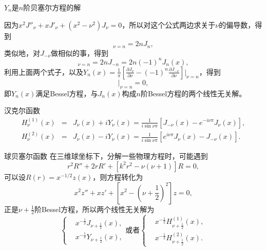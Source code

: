 \documentclass[11pt]{beamer}
\begin{document}
\begin{frame}{$Y_n$是$n$阶贝塞尔方程的解}

因为$ x^2 J''_\nu + x J'_\nu + (x^2 - \nu^2) J_\nu = 0$，所以对这个公式两边求关于$\nu$的偏导数，得到
\begin{equation}
[ x^2 (\frac{\partial J_\nu}{\partial \nu})'' + x (\frac{\partial J_\nu}{\partial \nu})'' + (x^2 - \nu^2)(\frac{\partial J_\nu}{\partial \nu}) ]_{\nu = n} = 2n J_n,
\end{equation}
类似地，对$J_{-\nu}$做相似的事，得到
\begin{equation}
[ x^2 (\frac{\partial J_{-\nu} }{\partial \nu})'' + x (\frac{\partial J_{-\nu} }{\partial \nu})'' + (x^2 - \nu^2)(\frac{\partial J_{-\nu}}{\partial \nu}) ]_{\nu = n} = 2n J_{-n} = 2n (-1)^n J_n(x),
\end{equation}
利用上面两个式子，以及$Y_n(x) = \frac{1}{\pi}[ \frac{\partial J_\nu}{\partial \nu} - (-1)^n \frac{ \partial J_{-\nu}}{ \partial \nu } ] |_{\nu = n}$，得到
\begin{equation}
[ x^2 Y''_\nu + x Y'_\nu + (x^2 - \nu^2) Y_\nu ]|_{\nu = n} = 0,
\end{equation}
即$Y_n(x)$满足Bessel方程，与$J_n(x)$构成$n$阶Bessel方程的两个线性无关解。
\end{frame}

\begin{frame}{汉克尔函数}
\begin{eqnarray}
H^{(1)}_\nu(x) &=& J_\nu(x) + i Y_\nu(x) = \frac{1}{i\sin \nu \pi}[ J_{-\nu}(x) - e^{-i\nu\pi}J_\nu(x) ] , \\
H^{(2)}_\nu(x) &=& J_\nu(x) - i Y_\nu(x) = \frac{1}{i\sin \nu \pi}[ e^{i\nu\pi} J_\nu(x) - J_{-\nu}(x) ].
\end{eqnarray}
\end{frame}

\begin{frame}{球贝塞尔函数}
在三维球坐标下，分解一些物理方程时，可能遇到
\begin{equation}
r^2 R'' + 2r R' + [k^2 r^2 - \nu(\nu+1)] R = 0,
\end{equation}
可以设$R(r) = x^{-1/2} z(x)$，则方程转化为
\begin{equation}
x^2 z'' + x z' + [x^2 - (\nu+\frac{1}{2})^2] z = 0,
\end{equation}
正是$\nu+\frac{1}{2}$阶Bessel方程，所以两个线性无关解为
\begin{equation}
\left\{
\begin{aligned}
& x^{-\frac{1}{2}} J_{\nu+\frac{1}{2}}(x), \\
& x^{-\frac{1}{2}} Y_{\nu+\frac{1}{2}}(x),
\end{aligned}
\right.
\text{或者}
\left\{
\begin{aligned}
& x^{-\frac{1}{2}} H^{(1)}_{\nu+\frac{1}{2}}(x), \\
& x^{-\frac{1}{2}} H^{(2)}_{\nu+\frac{1}{2}}(x).
\end{aligned}
\right.
\end{equation}
\end{frame}
\end{document}
